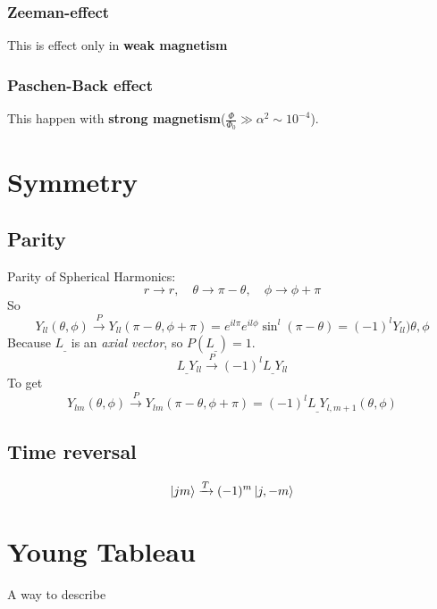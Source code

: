 \subsubsection{Zeeman-effect}
This is effect only in \textbf{weak magnetism}

\subsubsection{Paschen-Back effect}
This happen with \textbf{strong magnetism}($\frac{\Phi}{\Phi_0}\gg\alpha^2\sim10^{-4}$).


\section{Symmetry}

\subsection{Parity} 
Parity of Spherical Harmonics:
\[
    r\rightarrow{}r,\quad\theta\rightarrow\pi-\theta,\quad\phi\rightarrow\phi+\pi
    \]
So
\[
    Y_{ll}(\theta,\phi)\xrightarrow{P}Y_{ll}(\pi-\theta,\phi+\pi)=e^{il\pi}e^{il\phi}\sin^l(\pi-\theta)=(-1)^{l}Y_{ll})\theta,\phi
    \]
Because $L_\_$ is an \emph{axial vector}, so $P(L_\_)=1$.
\[
    L_\_Y_{ll}\xrightarrow{P}(-1)^{l}L_\_Y_{ll}
    \]
To get
\[
    Y_{lm}(\theta,\phi)\xrightarrow{P}Y_{lm}(\pi-\theta,\phi+\pi)=(-1)^{l}L_\_Y_{l,m+1}(\theta,\phi)
    \]

\subsection{Time reversal}
\[
    \ket{jm}\xrightarrow{T}(-1)^m\ket{j,-m}
    \]


\section{Young Tableau}
A way to describe 

